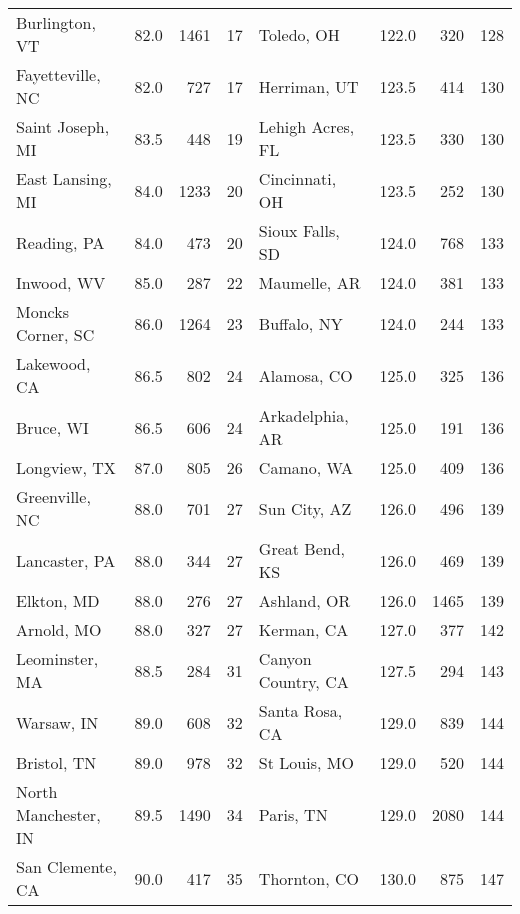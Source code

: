 \begin{longtable}{lrrr|lrrr}
Burlington, VT       &    82.0 &   1461 &    17 & Toledo, OH           &   122.0 &    320 &   128 \\
Fayetteville, NC     &    82.0 &    727 &    17 & Herriman, UT         &   123.5 &    414 &   130 \\
Saint Joseph, MI     &    83.5 &    448 &    19 & Lehigh Acres, FL     &   123.5 &    330 &   130 \\
East Lansing, MI     &    84.0 &   1233 &    20 & Cincinnati, OH       &   123.5 &    252 &   130 \\
Reading, PA          &    84.0 &    473 &    20 & Sioux Falls, SD      &   124.0 &    768 &   133 \\
Inwood, WV           &    85.0 &    287 &    22 & Maumelle, AR         &   124.0 &    381 &   133 \\
Moncks Corner, SC    &    86.0 &   1264 &    23 & Buffalo, NY          &   124.0 &    244 &   133 \\
Lakewood, CA         &    86.5 &    802 &    24 & Alamosa, CO          &   125.0 &    325 &   136 \\
Bruce, WI            &    86.5 &    606 &    24 & Arkadelphia, AR      &   125.0 &    191 &   136 \\
Longview, TX         &    87.0 &    805 &    26 & Camano, WA           &   125.0 &    409 &   136 \\
Greenville, NC       &    88.0 &    701 &    27 & Sun City, AZ         &   126.0 &    496 &   139 \\
Lancaster, PA        &    88.0 &    344 &    27 & Great Bend, KS       &   126.0 &    469 &   139 \\
Elkton, MD           &    88.0 &    276 &    27 & Ashland, OR          &   126.0 &   1465 &   139 \\
Arnold, MO           &    88.0 &    327 &    27 & Kerman, CA           &   127.0 &    377 &   142 \\
Leominster, MA       &    88.5 &    284 &    31 & Canyon Country, CA   &   127.5 &    294 &   143 \\
Warsaw, IN           &    89.0 &    608 &    32 & Santa Rosa, CA       &   129.0 &    839 &   144 \\
Bristol, TN          &    89.0 &    978 &    32 & St Louis, MO         &   129.0 &    520 &   144 \\
North Manchester, IN &    89.5 &   1490 &    34 & Paris, TN            &   129.0 &   2080 &   144 \\
San Clemente, CA     &    90.0 &    417 &    35 & Thornton, CO         &   130.0 &    875 &   147 \\

\end{longtable}
